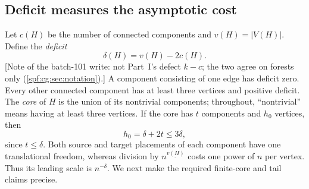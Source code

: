 \documentclass[11pt]{article}
\numberwithin{equation}{section}
\theoremstyle{definition}
\theoremstyle{remark}
\theoremstyle{definition}
\newcommand{\fall}[2]{{#1}^{\underline{#2}}}
\begin{document}
\subsection{Deficit measures the asymptotic cost}
Let $c(H)$ be the number of connected components and $v(H)=|V(H)|$. Define
the \emph{deficit}
\begin{equation}
 \delta(H)=v(H)-2c(H).
 \label{spf:cg:eq:deficit}
\end{equation}
[Note of the batch-101 write: not Part~I's defect $k-c$; the two agree on
forests only (\cref{spf:cg:sec:notation}).] A component consisting of one
edge has deficit zero. Every other connected component has at least three
vertices and positive deficit. The \emph{core} of $H$ is the union of its
nontrivial components; throughout, ``nontrivial'' means having at least three
vertices. If the core has $t$ components and $h_0$ vertices, then
\begin{equation}
 h_0=\delta+2t\le3\delta,
 \label{spf:cg:eq:corevertices}
\end{equation}
since $t\le\delta$. Both source and target placements of each component have
one translational freedom, whereas division by $\fall n{v(H)}$ costs one
power of $n$ per vertex. Thus its leading scale is $n^{-\delta}$. We next
make the required finite-core and tail claims precise.
\end{document}
